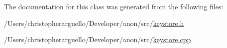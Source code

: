 The documentation for this class was generated from the following files\+:\begin{DoxyCompactItemize}
\item 
/\+Users/christopherarguello/\+Developer/anon/src/\mbox{\hyperlink{keystore_8h}{keystore.\+h}}\item 
/\+Users/christopherarguello/\+Developer/anon/src/\mbox{\hyperlink{keystore_8cpp}{keystore.\+cpp}}\end{DoxyCompactItemize}
